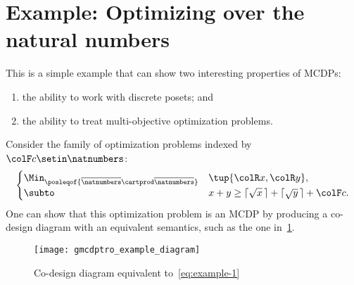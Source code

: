 
\section{Example: Optimizing over the natural numbers}

This is a simple example that can show two interesting properties of MCDPs:
\begin{enumerate}
    \item the ability to work with discrete posets; and
    \item the ability to treat multi-objective optimization problems.
\end{enumerate}
Consider the family of optimization problems indexed by~${\colF c}\setin\natnumbers$:
\begin{equation}
    \begin{cases}
        \Min_{\posleqof{\overline{\natnumbers}\cartprod\overline{\natnumbers}}} & \tup{ {\colR x},{\colR y}} ,                                    \\
        \subto                                                                  & x+y\geq\lceil\sqrt{x}\,\rceil+\lceil\sqrt{y}\,\rceil+{\colF c}.
    \end{cases}\label{eq:example-1}
\end{equation}
One can show that this optimization problem is an MCDP by producing a co-design diagram with an equivalent semantics, such as the one in~\cref{fig:toydiagram}.

\begin{figure}[h]
    \centering
    \texttt{[image: gmcdptro\_example\_diagram]}
    \caption{Co-design diagram equivalent to~\cref{eq:example-1}}
    \label{fig:toydiagram}
\end{figure}


